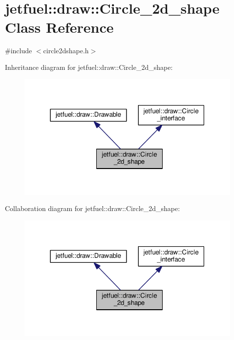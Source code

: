 \hypertarget{classjetfuel_1_1draw_1_1Circle__2d__shape}{}\section{jetfuel\+:\+:draw\+:\+:Circle\+\_\+2d\+\_\+shape Class Reference}
\label{classjetfuel_1_1draw_1_1Circle__2d__shape}


{\ttfamily \#include $<$circle2dshape.\+h$>$}



Inheritance diagram for jetfuel\+:\+:draw\+:\+:Circle\+\_\+2d\+\_\+shape\+:
\nopagebreak
\begin{figure}[H]
\begin{center}
\leavevmode
\includegraphics[width=316pt]{classjetfuel_1_1draw_1_1Circle__2d__shape__inherit__graph}
\end{center}
\end{figure}


Collaboration diagram for jetfuel\+:\+:draw\+:\+:Circle\+\_\+2d\+\_\+shape\+:
\nopagebreak
\begin{figure}[H]
\begin{center}
\leavevmode
\includegraphics[width=316pt]{classjetfuel_1_1draw_1_1Circle__2d__shape__coll__graph}
\end{center}
\end{figure}
